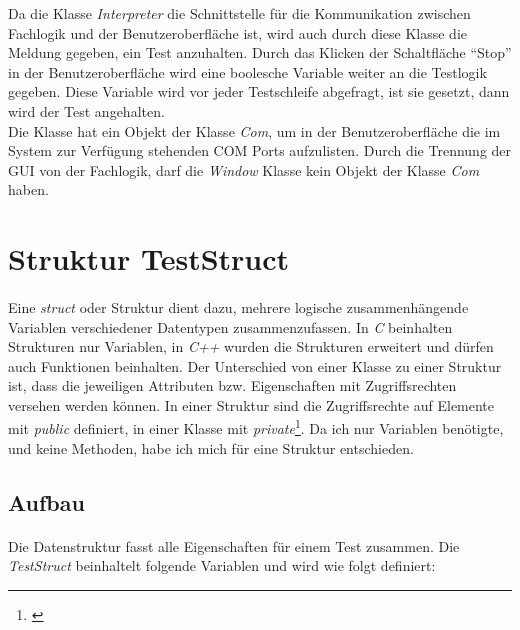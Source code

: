 Da die Klasse \textit{Interpreter} die Schnittstelle für die Kommunikation zwischen Fachlogik und der Benutzeroberfläche ist, wird auch durch diese Klasse die Meldung gegeben, ein Test anzuhalten. Durch das Klicken der Schaltfläche "`Stop"' in der Benutzeroberfläche wird eine boolesche Variable weiter an die Testlogik gegeben. Diese Variable wird vor jeder Testschleife abgefragt, ist sie gesetzt, dann wird der Test angehalten.\\

Die Klasse hat ein Objekt der Klasse \textit{Com}, um in der Benutzeroberfläche die im System zur Verfügung stehenden COM Ports aufzulisten. Durch die Trennung der GUI von der Fachlogik, darf die \textit{Window} Klasse kein Objekt der Klasse \textit{Com} haben.\\



\newpage

\section{Struktur TestStruct}\label{TestStruct}
\paragraph{}
Eine \textit{struct} oder Struktur dient dazu, mehrere logische zusammenhängende Variablen verschiedener Datentypen zusammenzufassen. In \textit{C} beinhalten Strukturen nur Variablen, in \textit{C++} wurden die Strukturen erweitert und dürfen auch Funktionen beinhalten. Der Unterschied von einer Klasse zu einer Struktur ist, dass die jeweiligen Attributen bzw. Eigenschaften mit Zugriffsrechten versehen werden können. In einer Struktur sind die Zugriffsrechte auf Elemente mit  \textit{public} definiert, in einer Klasse mit \textit{private}\footnote{\cite{VisualC++}}. Da ich nur Variablen benötigte, und keine Methoden, habe ich mich für eine Struktur entschieden.


\subsection{Aufbau}
\paragraph{}
Die Datenstruktur fasst alle Eigenschaften für einem Test zusammen. Die \textit{TestStruct} beinhaltelt folgende Variablen und wird wie folgt definiert:\\

